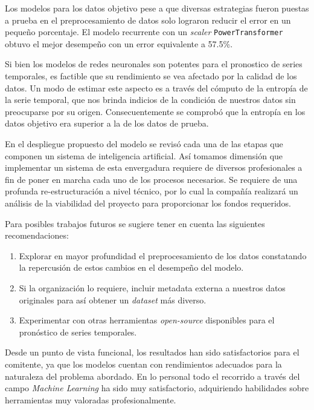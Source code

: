 \documentclass[a4paper,12pt]{article}
\begin{document}
		Los modelos para los datos objetivo pese a que diversas estrategias fueron puestas a prueba en el preprocesamiento de datos solo lograron reducir el error en un pequeño porcentaje. El modelo recurrente con un \textit{scaler} \texttt{PowerTransformer} obtuvo el mejor desempeño con un error equivalente a 57.5\%.
						
		Si bien los modelos de redes neuronales son potentes para el pronostico de series temporales, es factible que su rendimiento se vea afectado por la calidad de los datos. Un modo de estimar este aspecto es a través del cómputo de la entropía de la serie temporal, que nos brinda indicios de la condición de nuestros datos sin preocuparse por su origen. Consecuentemente se comprobó que la entropía en los datos objetivo era superior a la de los datos de prueba.
						
		En el despliegue propuesto del modelo se revisó cada una de las etapas que componen un sistema de inteligencia artificial. Así tomamos dimensión que implementar un sistema de esta envergadura requiere de diversos profesionales a fin de poner en marcha cada uno de los procesos necesarios. Se requiere de una profunda re-estructuración a nivel técnico, por lo cual la compañía realizará un análisis de la viabilidad del proyecto para proporcionar los fondos requeridos.
						
		Para posibles trabajos futuros se sugiere tener en cuenta las siguientes recomendaciones:
						
		\begin{enumerate}[noitemsep, topsep=2pt]
			\item Explorar en mayor profundidad el preprocesamiento de los datos constatando la repercusión de estos cambios en el desempeño del modelo.
			\item Si la organización lo requiere, incluir metadata externa a nuestros datos originales para así obtener un \textit{dataset} más diverso.
			\item Experimentar con otras herramientas \textit{open-source} disponibles para el pronóstico de series temporales.
		\end{enumerate}
						
		Desde un punto de vista funcional, los resultados han sido satisfactorios para el comitente, ya que los modelos cuentan con rendimientos adecuados para la naturaleza del problema abordado. En lo personal todo el recorrido a través del campo \textit{Machine Learning} ha sido muy satisfactorio, adquiriendo habilidades sobre herramientas muy valoradas profesionalmente.
						
		\clearpage
		
		\let\clearpage\relax
						
		{}
		
						
\end{document}

